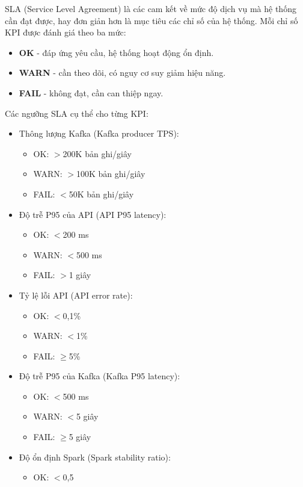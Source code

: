 \documentclass[../BTL.tex]{subfiles}
\begin{document}
SLA (Service Level Agreement) là các cam kết về mức độ dịch vụ mà hệ thống cần đạt được, hay đơn giản hơn là mục tiêu các chỉ số của hệ thống. Mỗi chỉ số KPI được đánh giá theo ba mức:
\begin{itemize}
    \item \textbf{OK} - đáp ứng yêu cầu, hệ thống hoạt động ổn định.
    \item \textbf{WARN} - cần theo dõi, có nguy cơ suy giảm hiệu năng.
    \item \textbf{FAIL} - không đạt, cần can thiệp ngay.
\end{itemize}
Các ngưỡng SLA cụ thể cho từng KPI:
\begin{itemize}
    \item Thông lượng Kafka (Kafka producer TPS):
    \begin{itemize}
        \item OK: $>$200K bản ghi/giây
        \item WARN: $>$100K bản ghi/giây
        \item FAIL: $<$50K bản ghi/giây
    \end{itemize}
    \item Độ trễ P95 của API (API P95 latency):
    \begin{itemize}
        \item OK: $<$200 ms
        \item WARN: $<$500 ms
        \item FAIL: $>$1 giây
    \end{itemize}
    \item Tỷ lệ lỗi API (API error rate):
    \begin{itemize}
        \item OK: $<$0,1\%
        \item WARN: $<$1\%
        \item FAIL: $\ge$5\%
    \end{itemize}
    \item Độ trễ P95 của Kafka (Kafka P95 latency):
    \begin{itemize}
        \item OK: $<$500 ms
        \item WARN: $<$5 giây
        \item FAIL: $\ge$5 giây
    \end{itemize}
    \item Độ ổn định Spark (Spark stability ratio):
    \begin{itemize}
        \item OK: $<$0,5

\end{itemize}
\end{itemize}
\end{document}
